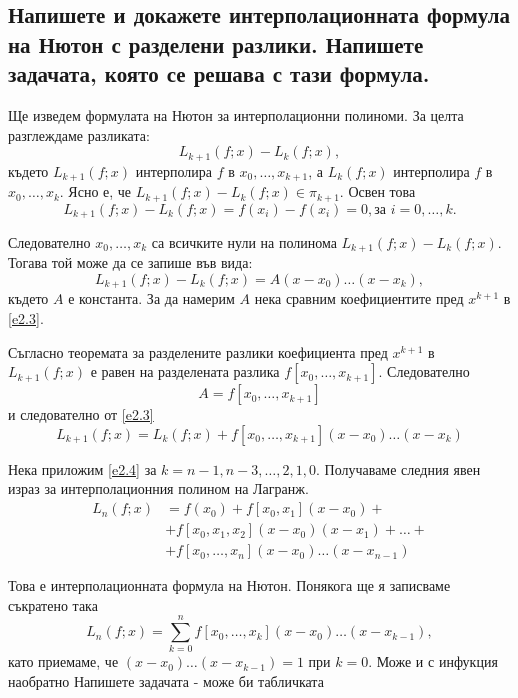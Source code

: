 \documentclass[12pt]{article}
\numberwithin{equation}{subsection}
\numberwithin{theorem}{subsection}
\numberwithin{definition}{subsection}
\numberwithin{corollary}{subsection}
\begin{document}
\subsection{Напишете и докажете интерполационната формула на Нютон с разделени разлики. Напишете задачата, която се решава с тази формула.}
  Ще изведем формулата на Нютон за интерполационни полиноми. За целта разглеждаме разликата:
  \begin{equation*}
  L_{k+1}(f;x) - L_k(f;x),
  \end{equation*}
  където $L_{k+1}(f;x)$ интерполира $f$ в $x_0,\dotso,x_{k+1}$, а $L_k(f;x)$ интерполира $f$ в $x_0,\dotso, x_k$. Ясно е, че $L_{k+1}(f;x) - L_k(f;x)\in\pi_{k+1}$. Освен това
  \begin{equation*}
  L_{k+1}(f;x) - L_k(f;x) = f(x_i) - f(x_i) = 0, \text{за } i = 0,\dotso,k.
  \end{equation*}
  \par
  Следователно $x_0,\dotso,x_k$ са всичките нули на полинома $L_{k+1}(f;x) - L_k(f;x)$. Тогава той може да се запише във вида:
  \begin{equation} \label{e2.3}
  L_{k+1}(f;x) - L_k(f;x) = A(x-x_0)\dotso(x-x_k),
  \end{equation}
  където $A$ е константа. За да намерим $A$ нека сравним коефициентите пред $x^{k+1}$ в \ref{e2.3}.
  \par
  Съгласно теоремата за разделените разлики коефициента пред $x^{k+1}$ в $L_{k+1}(f;x)$ е равен на разделената разлика $f[x_0,\dotso, x_{k+1}]$. Следователно 
  \begin{equation*}
  A = f[x_0,\dotso,x_{k+1}]
  \end{equation*}
  и следователно от \ref{e2.3}
  \begin{equation} \label{e2.4}
  L_{k+1}(f;x) = L_k(f;x) + f[x_0,\dotso,x_{k+1}](x-x_0)\dotso(x-x_k)
  \end{equation}
  \par
  Нека приложим \ref{e2.4} за $k=n-1,n-3,\dotso,2,1,0$. Получаваме следния явен израз за интерполационния полином на Лагранж.
  \begin{align*}
  L_n(f;x) &= f(x_0) + f[x_0,x_1](x-x_0) +\\&+f[x_0,x_1,x_2](x-x_0)(x-x_1)+\dotso+\\&+f[x_0,\dotso,x_n](x-x_0)\dotso(x-x_{n-1})
  \end{align*}
  \par
  Това е интерполационната формула на Нютон. Понякога ще я записваме съкратено така
  \begin{equation}\label{e2.5}
  L_n(f;x) = \displaystyle\sum_{k=0}^nf[x_0,\dotso,x_k](x-x_0)\dotso(x-x_{k-1}),
  \end{equation}
  като приемаме, че $(x-x_0)\dotso(x-x_{k-1}) = 1$ при $k=0$.
  Може и с инфукция наобратно
  Напишете задачата - може би табличката
\end{document}
